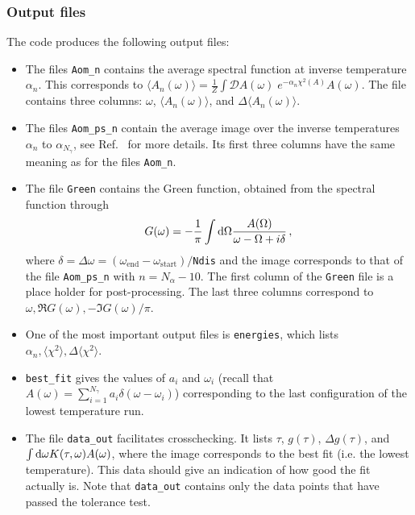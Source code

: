 \subsubsection*{Output files}

The code produces the following output files:

\begin{itemize}
\item The files  \texttt{Aom\_n} contains the average spectral function at inverse temperature  $ \alpha_n $. This corresponds to
$  \langle A_n(\omega) \rangle =   \frac{1}{Z}   \int \mathcal{D}\!A(\omega) \; e^{-\alpha_n \chi^{2}(A)  } A(\omega). $
The file contains three columns: $\omega$, $\langle A_n(\omega) \rangle$, and $\Delta \langle A_n(\omega) \rangle$.

\item The files \texttt{Aom\_ps\_n}  contain the average image over the inverse  temperatures  $ \alpha_n $ to $ \alpha_{N_\gamma}$, see Ref.~\cite{Beach04a} for more details.   
 Its first three columns have the same meaning as for the files \texttt{Aom\_n}.

\item The file \texttt{Green} contains the Green function, obtained from the spectral function through
\begin{equation}
 G(\omega) =  -\frac{1}{\pi} \int \mathrm{d} \Omega   \frac{A(\Omega)}{\omega - \Omega + i \delta} \,,
\end{equation}
where  $ \delta =  \Delta \omega = (\omega_\mathrm{end} -  \omega_\mathrm{start})/$\texttt{Ndis} and the image corresponds to that of the file \texttt{Aom\_ps\_n} with $ n = N_{\alpha} -10 $. 
The first column of the  \texttt{Green}  file is a place holder for post-processing. The last three columns   correspond to $\omega, \Re G(\omega) ,   - \Im G(\omega)/\pi $. 

\item  One of the most important output files is \texttt{energies}, which lists $ \alpha_n, \langle \chi^2 \rangle, \Delta \langle \chi^2 \rangle $.

\item  \texttt{best\_fit}  gives the values of $a_i$ and $\omega_i$   (recall that $ A(\omega)  = \sum_{i=1}^{N_{\gamma}} a_{i} \delta \left( \omega - \omega_i \right)$) corresponding to the last configuration of the  lowest temperature run.

\item The file \texttt{data\_out} facilitates crosschecking. It lists $\tau$,  $g(\tau)$, $\Delta g(\tau)$, and $\int \mathrm{d} \omega  K(\tau, \omega) A(\omega)$, where the image corresponds to the best fit (i.e. the lowest temperature). This data should give an indication of how good the fit actually is.  Note that  \texttt{data\_out} contains only the data points that have  passed the tolerance test. 


\end{itemize}
